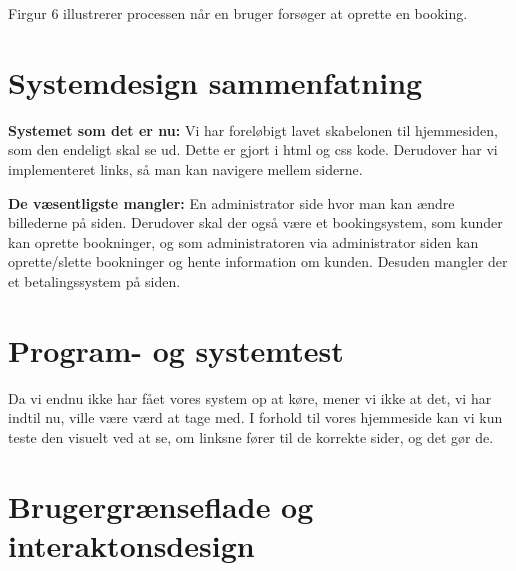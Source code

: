 \documentclass[12pt,a4paper]{article}
\begin{document}
Firgur 6 illustrerer processen når en bruger forsøger at oprette en booking.
\newpage
\section{Systemdesign sammenfatning}
\textbf{Systemet som det er nu:}
Vi har foreløbigt lavet skabelonen til hjemmesiden, som den endeligt skal se ud. Dette er gjort i html og css kode. Derudover har vi implementeret links, så man kan navigere mellem siderne. 

\textbf{De væsentligste mangler:}
En administrator side hvor man kan ændre billederne på siden. 
Derudover skal der også være et bookingsystem, som kunder kan oprette bookninger, og som administratoren via administrator siden kan oprette/slette bookninger og hente information om kunden. Desuden mangler der et betalingssystem på siden.

\section{Program- og systemtest}
Da vi endnu ikke har fået vores system op at køre, mener vi ikke at det, vi har indtil nu, ville være værd at tage med. I forhold til vores hjemmeside kan vi kun teste den visuelt ved at se, om linksne fører til de korrekte sider, og det gør de.

\section{Brugergrænseflade og interaktonsdesign}
\end{document}
